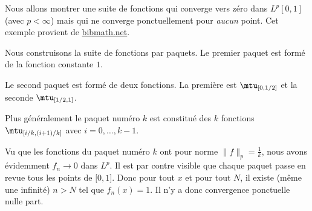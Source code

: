 \begin{example}
    Nous allons montrer une suite de fonctions qui converge vers zéro dans \( L^p[0,1]\) (avec \( p<\infty\)) mais qui ne converge ponctuellement pour \emph{aucun} point. Cet exemple provient de \href{http://www.bibmath.net/dico/index.php?action=affiche&quoi=./b/bosseglissante.html}{bibmath.net}. 

    Nous construisons la suite de fonctions par paquets. Le premier paquet est formé de la fonction constante \( 1\).

    Le second paquet est formé de deux fonctions. La première est \( \mtu_{\mathopen[0 , 1/2 \mathclose]}\) et la seconde \( \mtu_{\mathopen[ 1/2 , 1 \mathclose]}\).

    Plus généralement le paquet numéro \( k\) est constitué des \( k\) fonctions \( \mtu_{\mathopen[ i/k , (i+1)/k \mathclose]}\) avec \( i=0,\ldots, k-1\).

    Vu que les fonctions du paquet numéro \( k\) ont pour norme \( \| f \|_p=\frac{1}{ k }\), nous avons évidemment \( f_n\to 0\) dans \( L^p\). Il est par contre visible que chaque paquet passe en revue tous les points de \( \mathopen[ 0 , 1 \mathclose]\). Donc pour tout \( x\) et pour tout \( N\), il existe (même une infinité) \( n>N\) tel que \( f_n(x)=1\). Il n'y a donc convergence ponctuelle nulle part.
\end{example}
